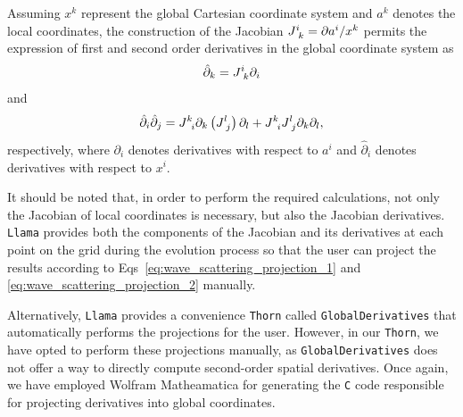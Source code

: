 Assuming $x^k$ represent the global Cartesian coordinate system and $a^k$ denotes the local coordinates, the construction of the Jacobian $\tens{J}{i}{k} = \partial a^i / x^k$ permits the expression of first and second order derivatives in the global coordinate system as
%
\begin{equation}
  \hat{\partial}_k = \tens{J}{i}{k} \partial_i
  \label{eq:wave_scattering_projection_1}
\end{equation}
%
and
%
\begin{equation}
  \hat{\partial}_i \hat{\partial}_j = \tens{J}{k}{i} \partial_k \left( \tens{J}{l}{j} \right) \partial_l + \tens{J}{k}{i}\tens{J}{l}{j}\partial_k\partial_l,
  \label{eq:wave_scattering_projection_2}
\end{equation}
%
respectively, where $\partial_i$ denotes derivatives with respect to $a^i$ and $\hat{\partial}_i$ denotes derivatives with respect to $x^i$.

It should be noted that, in order to perform the required calculations, not only the Jacobian of local coordinates is necessary, but also the Jacobian derivatives. \texttt{Llama} provides both the components of the Jacobian and its derivatives at each point on the grid during the evolution process so that the user can project the results according to Eqs~\eqref{eq:wave_scattering_projection_1} and \eqref{eq:wave_scattering_projection_2} manually.

Alternatively, \texttt{Llama} provides a convenience \texttt{Thorn} called \texttt{GlobalDerivatives} that automatically performs the projections for the user. However, in our \texttt{Thorn}, we have opted to perform these projections manually, as \texttt{GlobalDerivatives} does not offer a way to directly compute second-order spatial derivatives. Once again, we have employed Wolfram Matheamatica for generating the \texttt{C} code responsible for projecting derivatives into global coordinates.